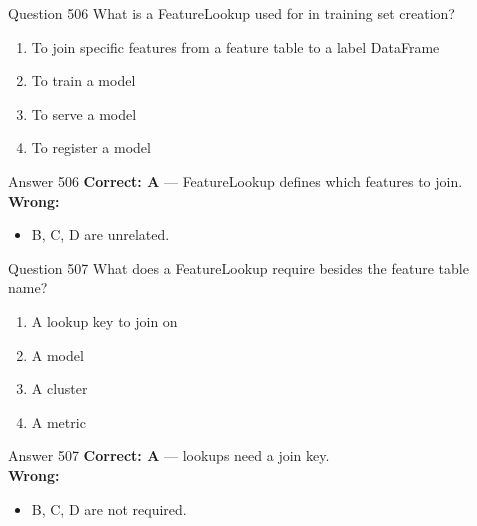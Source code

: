 \documentclass[aspectratio=169,11pt]{beamer}
\begin{document}
	\begin{frame}{Question 506}
		What is a FeatureLookup used for in training set creation?
		\begin{enumerate}[label=\Alph*.]
			\item To join specific features from a feature table to a label DataFrame
			\item To train a model
			\item To serve a model
			\item To register a model
		\end{enumerate}
	\end{frame}
	\begin{frame}{Answer 506}
		\textbf{Correct: A} --- FeatureLookup defines which features to join.\\
		\vspace{0.5em}
		\textbf{Wrong:}
		\begin{itemize}
			\item B, C, D are unrelated.
		\end{itemize}
	\end{frame}
	
	\begin{frame}{Question 507}
		What does a FeatureLookup require besides the feature table name?
		\begin{enumerate}[label=\Alph*.]
			\item A lookup key to join on
			\item A model
			\item A cluster
			\item A metric
		\end{enumerate}
	\end{frame}
	\begin{frame}{Answer 507}
		\textbf{Correct: A} --- lookups need a join key.\\
		\vspace{0.5em}
		\textbf{Wrong:}
		\begin{itemize}
			\item B, C, D are not required.
		\end{itemize}
	\end{frame}
	
\end{document}
